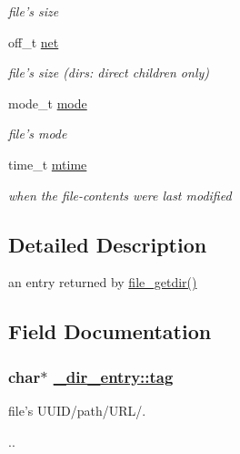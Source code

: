 \begin{CompactItemize}
\begin{CompactList}\small\item\em file's size \item\end{CompactList}\item 
\hypertarget{struct__dir__entry_o6}{
off\_\-t \hyperlink{struct__dir__entry_o6}{net}}
\label{struct__dir__entry_o6}

\begin{CompactList}\small\item\em file's size (dirs: direct children only) \item\end{CompactList}\item 
\hypertarget{struct__dir__entry_o7}{
mode\_\-t \hyperlink{struct__dir__entry_o7}{mode}}
\label{struct__dir__entry_o7}

\begin{CompactList}\small\item\em file's mode \item\end{CompactList}\item 
\hypertarget{struct__dir__entry_o8}{
time\_\-t \hyperlink{struct__dir__entry_o8}{mtime}}
\label{struct__dir__entry_o8}

\begin{CompactList}\small\item\em when the file-contents were last modified \item\end{CompactList}\end{CompactItemize}


\subsection{Detailed Description}
an entry returned by \hyperlink{file_8c_a41}{file\_\-getdir()} 



\subsection{Field Documentation}
\hypertarget{struct__dir__entry_o2}{
\subsubsection[tag]{\setlength{\rightskip}{0pt plus 5cm}char$\ast$ \hyperlink{struct__dir__entry_o2}{\_\-dir\_\-entry::tag}}}
\label{struct__dir__entry_o2}


file's UUID/path/URL/. 

.. 
